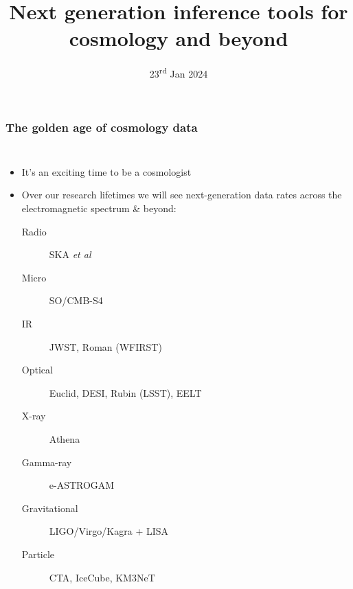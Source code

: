 \documentclass[aspectratio=169,handout]{beamer}
\title{Next generation inference tools for cosmology and beyond}
\date{23\textsuperscript{rd} Jan 2024}
\begin{document}
\begin{frame}
    \titlepage
\end{frame}

\begin{frame}
    \frametitle{The golden age of cosmology data}
    \begin{columns}
        \begin{itemize}
            \item It's an exciting time to be a cosmologist
            \item Over our research lifetimes we will see next-generation data rates across the electromagnetic spectrum \& beyond:
                \begin{description}
                    \item[Radio] SKA \textit{et al}
                    \item[Micro] SO/CMB-S4
                    \item[IR] JWST, Roman (WFIRST)
                    \item[Optical] Euclid, DESI, Rubin (LSST), EELT
                    \item[X-ray] Athena
                    \item[Gamma-ray] e-ASTROGAM
                    \item[Gravitational] LIGO/Virgo/Kagra + LISA
                    \item[Particle] CTA, IceCube, KM3NeT
                \end{description}
        \end{itemize}


\end{columns}
\end{frame}
\end{document}
